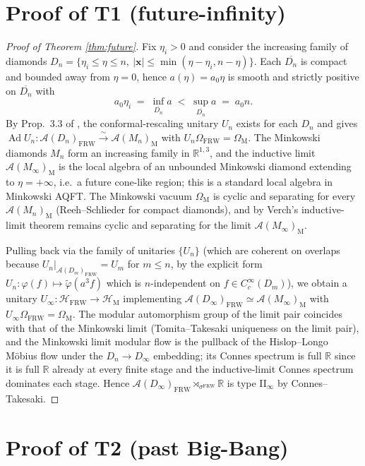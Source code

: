 \documentclass[11pt]{article}
\theoremstyle{definition}
\newcommand{\R}{\mathbb{R}}
\newcommand{\HH}{\mathcal{H}}
\renewcommand{\AA}{\mathcal{A}}
\newcommand{\Ad}{\operatorname{Ad}}
\newcommand{\FRW}{\mathrm{FRW}}
\newcommand{\Mink}{\mathrm{M}}
\begin{document}
\section{Proof of T1 (future-infinity)}

\begin{proof}[Proof of Theorem \ref{thm:future}]
Fix $\eta_i>0$ and consider the increasing family of diamonds
$D_n=\{\eta_i\le\eta\le n,\ |\mathbf{x}|\le \min(\eta-\eta_i,n-\eta)\}$.
Each $\overline{D_n}$ is compact and bounded away from $\eta=0$, hence
$a(\eta)=a_0\eta$ is smooth and strictly positive on $\overline{D_n}$ with
\begin{equation*}
a_0\eta_i \;=\; \inf_{\overline{D_n}} a \;<\; \sup_{\overline{D_n}} a
\;=\; a_0 n.
\end{equation*}
By Prop.~3.3 of \cite{frw_note}, the conformal-rescaling unitary $U_n$
exists for each $D_n$ and gives $\Ad U_n:\AA(D_n)_\FRW\xrightarrow{\sim}
\AA(M_n)_\Mink$ with $U_n\Omega_\FRW=\Omega_\Mink$. The Minkowski
diamonds $M_n$ form an increasing family in $\R^{1,3}$, and the inductive
limit $\AA(M_\infty)_\Mink$ is the local algebra of an unbounded
Minkowski diamond extending to $\eta=+\infty$, i.e.\ a future cone-like
region; this is a standard local algebra in Minkowski AQFT. The
Minkowski vacuum $\Omega_\Mink$ is cyclic and separating for every
$\AA(M_n)_\Mink$ (Reeh--Schlieder for compact diamonds), and by Verch's
inductive-limit theorem \cite{Verch1997} remains cyclic and separating
for the limit $\AA(M_\infty)_\Mink$.

Pulling back via the family of unitaries $\{U_n\}$ (which are coherent on
overlaps because $U_n|_{\AA(D_m)_\FRW}=U_m$ for $m\le n$, by the
explicit form $U_n:\varphi(f)\mapsto\tilde\varphi(a^3 f)$ which is
$n$-independent on $f\in C_c^\infty(D_m)$), we obtain a unitary
$U_\infty:\HH_\FRW\to\HH_\Mink$ implementing $\AA(D_\infty)_\FRW\simeq
\AA(M_\infty)_\Mink$ with $U_\infty\Omega_\FRW=\Omega_\Mink$. The
modular automorphism group of the limit pair coincides with that of the
Minkowski limit (Tomita--Takesaki uniqueness on the limit pair), and
the Minkowski limit modular flow is the pullback of the Hislop--Longo
M\"obius flow under the $D_n\to D_\infty$ embedding; its Connes spectrum
is full $\R$ since it is full $\R$ already at every finite stage and the
inductive-limit Connes spectrum dominates each stage. Hence
$\AA(D_\infty)_\FRW\rtimes_{\sigma^\FRW}\R$ is type II$_\infty$ by
Connes--Takesaki.
\end{proof}

\section{Proof of T2 (past Big-Bang)}
\end{document}
